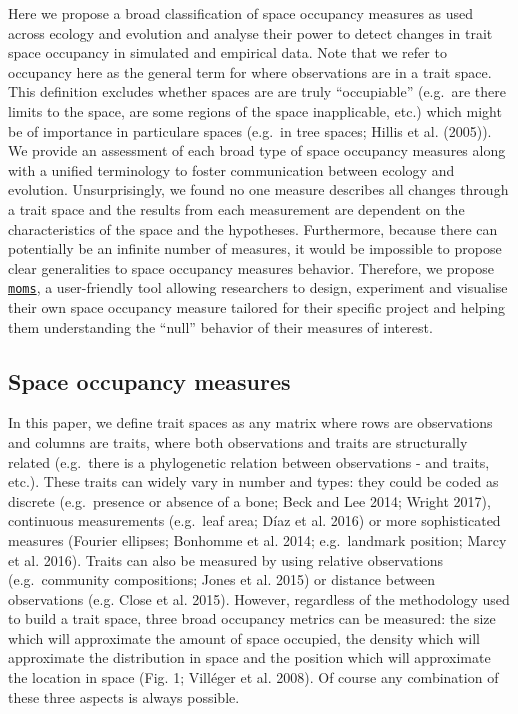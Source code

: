 \documentclass[]{article}
\begin{document}
Here we propose a broad classification of space occupancy measures as
used across ecology and evolution and analyse their power to detect
changes in trait space occupancy in simulated and empirical data. Note
that we refer to occupancy here as the general term for where
observations are in a trait space. This definition excludes whether
spaces are are truly ``occupiable'' (e.g.~are there limits to the space,
are some regions of the space inapplicable, etc.) which might be of
importance in particulare spaces (e.g.~in tree spaces; Hillis et al.
(2005)). We provide an assessment of each broad type of space occupancy
measures along with a unified terminology to foster communication
between ecology and evolution. Unsurprisingly, we found no one measure
describes all changes through a trait space and the results from each
measurement are dependent on the characteristics of the space and the
hypotheses. Furthermore, because there can potentially be an infinite
number of measures, it would be impossible to propose clear generalities
to space occupancy measures behavior. Therefore, we propose
\href{https://tguillerme.shinyapps.io/moms/}{\texttt{moms}}, a
user-friendly tool allowing researchers to design, experiment and
visualise their own space occupancy measure tailored for their specific
project and helping them understanding the ``null'' behavior of their
measures of interest.

\subsection{Space occupancy measures}\label{space-occupancy-measures}

In this paper, we define trait spaces as any matrix where rows are
observations and columns are traits, where both observations and traits
are structurally related (e.g.~there is a phylogenetic relation between
observations - and traits, etc.). These traits can widely vary in number
and types: they could be coded as discrete (e.g.~presence or absence of
a bone; Beck and Lee 2014; Wright 2017), continuous measurements
(e.g.~leaf area; Díaz et al. 2016) or more sophisticated measures
(Fourier ellipses; Bonhomme et al. 2014; e.g.~landmark position; Marcy
et al. 2016). Traits can also be measured by using relative observations
(e.g.~community compositions; Jones et al. 2015) or distance between
observations (e.g. Close et al. 2015). However, regardless of the
methodology used to build a trait space, three broad occupancy metrics
can be measured: the size which will approximate the amount of space
occupied, the density which will approximate the distribution in space
and the position which will approximate the location in space (Fig. 1;
Villéger et al. 2008). Of course any combination of these three aspects
is always possible.
\end{document}
